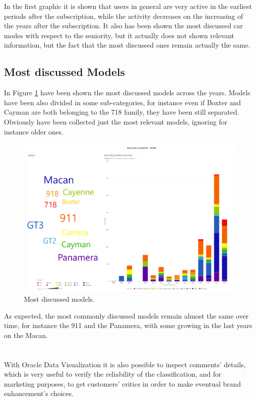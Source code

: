 In the first graphic it is shown that users in general are very active in the earliest periods after the subscription, while the activity decreases on the increasing of the years after the subscription. It also has been shown the most discussed car modes with respect to the seniority, but it actually does not shown relevant information, but the fact that the most discussed ones remain actually the same.

\subsection{Most discussed Models}

In Figure \ref{fig:models} have been shown the most discussed models across the years. Models have been also divided in some sub-categories, for instance even if Boxter and Cayman are both belonging to the 718 family, they have been still separated. Obviously have been collected just the most relevant models, ignoring for instance older ones.

\begin{figure}[H]
	\centering
	\includegraphics[width=\textwidth]{figures/odv_export/dataset_data_visualization_13.pdf}
	\caption{Most discussed models.}
	\label{fig:models}
\end{figure}

As expected, the most commonly discussed models remain almost the same over time, for instance the 911 and the Panamera, with some growing in the last years on the Macan.
\\\\\\
With Oracle Data Visualization it is also possible to inspect comments' details, which is very useful to verify the reliability of the classification, and for marketing purposes, to get customers' critics in order to make eventual brand enhancement's choices.


